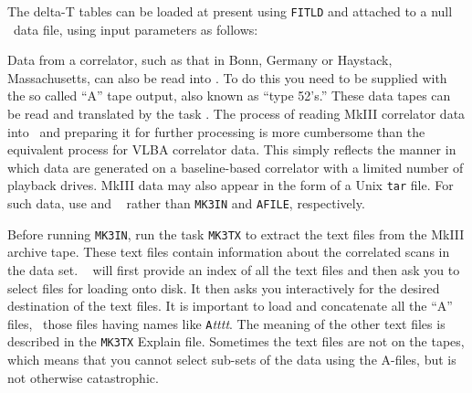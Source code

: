 The delta-T tables can be loaded at present using {\tt FITLD} and
attached to a null \uv\ data file, using input parameters as follows:



Data from a  correlator, such as that in Bonn, Germany or
Haystack, Massachusetts, can also be read into \AIPS\@.  To do this
you need to be supplied with the so called ``A'' tape output, also
known as ``type 52's.''  These data tapes can be read and translated
by the task {\tt {}}\@.  The process of reading MkIII
correlator data into \AIPS\ and preparing it for further processing is
more cumbersome than the equivalent process for VLBA correlator data.
This simply reflects the manner in which data are generated on a
baseline-based correlator with a limited number of playback
drives.  MkIII data may also appear in the form of a Unix
{\tt tar} file.  For such data, use {\tt {}} and {\tt
{}} rather than {\tt MK3IN} and {\tt AFILE}, respectively.

Before running {\tt MK3IN}, run the task {\tt MK3TX} to extract
the text files from the MkIII archive tape.  These text files contain
information about the correlated scans in the data set. {\tt
{}} will first provide an index of all the text files and
then ask you to select files for loading onto disk.  It then asks you
interactively for the desired destination of the text files.  It is
important to load and concatenate all the ``A'' files, \ie\ those
files having names like {\tt A}{\it tttt\/}.  The meaning of the other
text files is described in the {\tt MK3TX} Explain file.  Sometimes
the text files are not on the tapes, which means that you cannot
select sub-sets of the data using the A-files, but is not otherwise
catastrophic.

